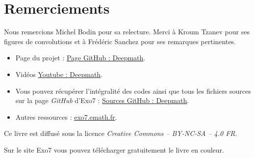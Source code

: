 
\clearemptydoublepage
\pagestyle{empty}\thispagestyle{empty}

\vspace*{\fill}

\section*{Remerciements}


Nous remercions Michel Bodin pour sa relecture.
Merci à Kroum Tzanev pour ses figures de convolutions et à Frédéric Sanchez pour ses remarques pertinentes.

\bigskip

\begin{itemize}

  \item Page du projet : \href{https://exo7math.github.io/deepmath-exo7/}{\og{}Page GitHub : Deepmath\fg{}}.

  \item Vidéos \href{https://www.youtube.com/channel/UCnKarYaG1VuzdWix1vBitFg/}{\og{}Youtube : Deepmath\fg{}}.

  \item Vous pouvez récupérer l'intégralité des codes \Python{} ainsi que tous les fichiers sources sur la page \emph{GitHub} d'Exo7 :
\href{https://github.com/exo7math/deepmath-exo7}{\og{}Sources GitHub : Deepmath\fg{}}.
  
  \item Autres ressources : \href{http://exo7.emath.fr/}{exo7.emath.fr}.
\end{itemize}




\vspace*{\fill}

\bigskip 

\begin{center}
\end{center}



\begin{center}
Ce livre est diffusé sous la licence \emph{Creative Commons -- BY-NC-SA -- 4.0 FR}.

Sur le site Exo7 vous pouvez télécharger gratuitement le livre en couleur.
\end{center}




\printindex
{}

